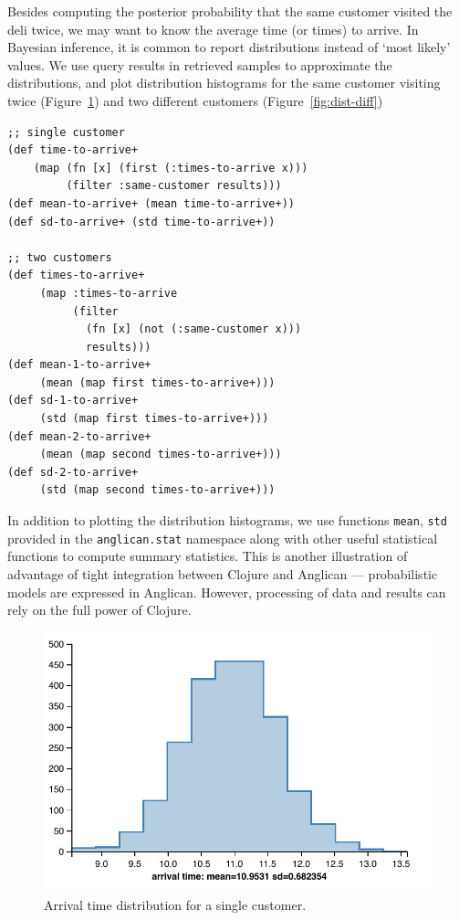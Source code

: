 \documentclass[preprint]{sigplanconf}
\begin{document}
Besides computing the posterior probability that the same
customer visited the deli twice, we may want to know the average
time (or times) to arrive. In Bayesian inference, it is common
to report distributions instead of `most likely' values. We use
query results in retrieved samples to approximate the
distributions, and plot distribution histograms for the same
customer visiting twice (Figure~\ref{fig:dist-same}) and
two different customers (Figure~\ref{fig:dist-diff})

\begin{lstlisting}[style=default]
;; single customer                      
(def time-to-arrive+ 
    (map (fn [x] (first (:times-to-arrive x)))
         (filter :same-customer results)))
(def mean-to-arrive+ (mean time-to-arrive+))
(def sd-to-arrive+ (std time-to-arrive+))

;; two customers
(def times-to-arrive+ 
     (map :times-to-arrive 
          (filter  
            (fn [x] (not (:same-customer x)))
            results)))
(def mean-1-to-arrive+
     (mean (map first times-to-arrive+)))
(def sd-1-to-arrive+
     (std (map first times-to-arrive+)))
(def mean-2-to-arrive+
     (mean (map second times-to-arrive+)))
(def sd-2-to-arrive+
     (std (map second times-to-arrive+)))
\end{lstlisting}

In addition to plotting the distribution histograms, we use
functions \texttt{mean}, \texttt{std} provided
in the \texttt{anglican.{\linebreak[0]}stat} namespace
along with other useful statistical functions to compute
summary statistics. This is another illustration of advantage of
tight integration between Clojure and Anglican --- probabilistic
models are expressed in Anglican. However, processing of data
and results can rely on the full power of Clojure.

\begin{figure}
    \centering
    \includegraphics[trim={12pt 0 0 0},scale=0.6]{same-customer-time.pdf}
    \caption{Arrival time distribution for a single customer.}
    \label{fig:dist-same}
\end{figure}
\end{document}
